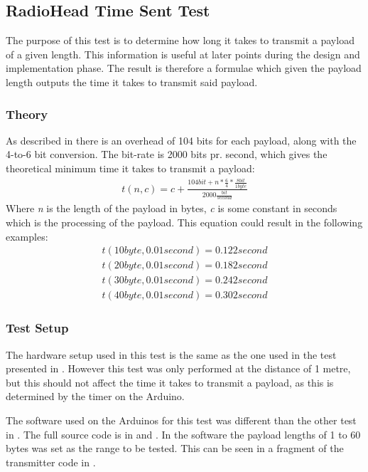 \subsection{RadioHead Time Sent Test} %
\label{sub:radiohead_time_sent_test}
The purpose of this test is to determine how long it takes to transmit a payload of a given length.
This information is useful at later points during the design and implementation phase. 
The result is therefore a formulae which given the payload length outputs the time it takes to transmit said payload. 

\subsubsection*{Theory}
As described in  there is an overhead of 104 bits for each payload, along with the 4-to-6 bit conversion.
The bit-rate is 2000 bits pr. second, which gives the theoretical minimum time it takes to transmit a payload:
\begin{align*}
t(n,c)=c+\frac { 104 bit+n*\frac { 6 }{ 4 } *\frac { 8 bit }{ 1 byte }  }{ 2000\frac { bit }{ second }  } 
\end{align*}
Where \textit{n} is the length of the payload in bytes, \textit{c} is some constant in seconds which is the processing of the payload. This equation could result in the following examples:
\begin{align*}
t(10 byte, 0.01 second) = 0.122 second\\
t(20 byte, 0.01 second) = 0.182 second\\
t(30 byte, 0.01 second) = 0.242 second\\
t(40 byte, 0.01 second) = 0.302 second
\end{align*}

\subsubsection*{Test Setup}
The hardware setup used in this test is the same as the one used in the test presented in .
However this test was only performed at the distance of 1 metre, but this should not affect the time it takes to transmit a payload, as this is determined by the timer on the Arduino.

The software used on the Arduinos for this test was different than the other test in . 
The full source code is in  and .
In the software the payload lengths of 1 to 60 bytes was set as the range to be tested. This can be seen in a fragment of the transmitter code in .

